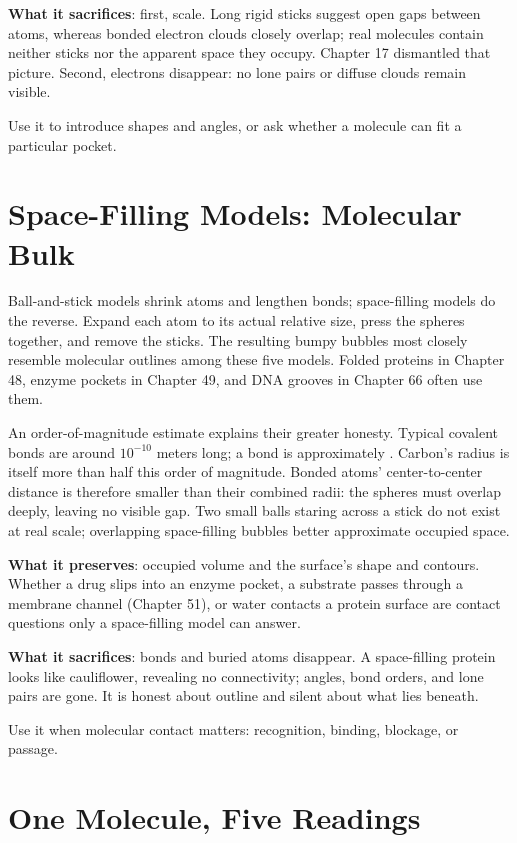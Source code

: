 \textbf{What it sacrifices}: first, scale. Long rigid sticks suggest open gaps between atoms, whereas bonded electron clouds closely overlap; real molecules contain neither sticks nor the apparent space they occupy. Chapter 17 dismantled that picture. Second, electrons disappear: no lone pairs or diffuse clouds remain visible.

Use it to introduce shapes and angles, or ask whether a molecule can fit a particular pocket.

\section{Space-Filling Models: Molecular Bulk}

Ball-and-stick models shrink atoms and lengthen bonds; space-filling models do the reverse. Expand each atom to its actual relative size, press the spheres together, and remove the sticks. The resulting bumpy bubbles most closely resemble molecular outlines among these five models. Folded proteins in Chapter 48, enzyme pockets in Chapter 49, and DNA grooves in Chapter 66 often use them.

An order-of-magnitude estimate explains their greater honesty. Typical covalent bonds are around $10^{-10}$ meters long; a  bond is approximately . Carbon's radius is itself more than half this order of magnitude. Bonded atoms' center-to-center distance is therefore smaller than their combined radii: the spheres must overlap deeply, leaving no visible gap. Two small balls staring across a stick do not exist at real scale; overlapping space-filling bubbles better approximate occupied space.

\textbf{What it preserves}: occupied volume and the surface's shape and contours. Whether a drug slips into an enzyme pocket, a substrate passes through a membrane channel (Chapter 51), or water contacts a protein surface are contact questions only a space-filling model can answer.

\textbf{What it sacrifices}: bonds and buried atoms disappear. A space-filling protein looks like cauliflower, revealing no connectivity; angles, bond orders, and lone pairs are gone. It is honest about outline and silent about what lies beneath.

Use it when molecular contact matters: recognition, binding, blockage, or passage.

\section{One Molecule, Five Readings}

